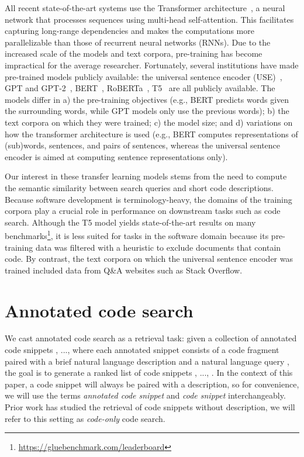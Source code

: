\documentclass[12pt,conference, onecolumn]{IEEEtran}
\begin{document}
All recent state-of-the-art systems use the Transformer architecture~\cite{Vaswani2017}, a neural network that processes sequences using multi-head self-attention. This facilitates capturing long-range dependencies and makes the computations more parallelizable than those of recurrent neural networks (RNNs). Due to the increased scale of the models and text corpora, pre-training has become impractical for the average researcher. Fortunately, several institutions have made pre-trained models publicly available: the universal sentence encoder (USE)~\cite{cer2018universal}, GPT and GPT-2~\cite{radford2018improving,radford2019language}, BERT~\cite{Peters:2018}, RoBERTa~\cite{liu:2019-roberta}, T5~\cite{raffel2019t5} are all publicly available. The models differ in a) the pre-training objectives (e.g., BERT predicts words given the surrounding words, while GPT models only use the previous words); b) the text corpora on which they were trained; c) the model size; and d) variations on how the transformer architecture is used (e.g., BERT computes representations of (sub)words, sentences, and pairs of sentences, whereas the universal sentence encoder is aimed at computing sentence representations only).

Our interest in these transfer learning models stems from the need to compute the semantic similarity between search queries and short code descriptions. Because software development is terminology-heavy, the domains of the training corpora play a crucial role in performance on downstream tasks such as code search. Although the T5 model yields state-of-the-art results on many benchmarks\footnote{\url{https://gluebenchmark.com/leaderboard}}, it is less suited for tasks in the software domain because its pre-training data was filtered with a heuristic to exclude documents that contain code. By contrast, the text corpora on which the universal sentence encoder was trained included data from Q\&A websites such as Stack Overflow. 
\section{Annotated code search}\label{sub:acs_problem}

We cast annotated code search as a retrieval task: given a collection of annotated code snippets , ...,  where each annotated snippet  consists of a code fragment  paired with a brief natural language description  and a natural language query , the goal is to generate a ranked list of code snippets , ..., . In the context of this paper, a code snippet will always be paired with a description, so for convenience, we will use the terms \textit{annotated code snippet} and \textit{code snippet} interchangeably. Prior work has studied the retrieval of code snippets without description, we will refer to this setting as \textit{code-only} code search. 
\end{document}
